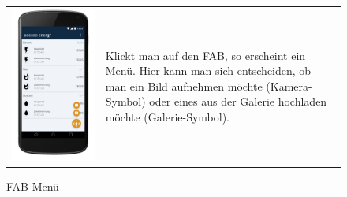 \begin{figure}[h]
\begin{tabularx}{\textwidth}{X  X}
	\includegraphics[scale = 0.155]{img/AndroidMockup/FABMenu} \caption{FAB-Menü}  & Klickt man auf den FAB, so erscheint ein Menü. Hier kann man sich entscheiden, ob man ein Bild aufnehmen möchte (Kamera-Symbol) oder eines aus der Galerie hochladen möchte (Galerie-Symbol). \\

\end{tabularx}
\end{figure}
